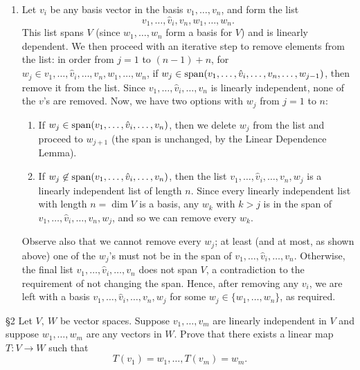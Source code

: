 \documentclass{homework}
\begin{document}
\begin{solution}
\begin{enumerate}[label=(\alph*)]
    \item Let $v_i$ be any basis vector in the basis $v_1,\ldots,v_n$, and form the list \[
      v_1,\ldots,\hat{v}_i, v_n, w_1,\ldots,w_n
    .\] This list spans $V$ (since $ w_1,\ldots,w_n$ form a basis for $V$) and is linearly
    dependent. We then proceed with an iterative step to remove elements from the list: in order
    from $j=1$ to $(n-1)+n$, for $w_j\in {v_1,\ldots,\hat{v}_i,\ldots,v_n, w_1,\ldots,w_n}$, if
    $w_j\in \operatorname{span}(v_1,\ldots,\hat{v}_i,\ldots,v_n,\ldots,w_{j-1})$, then remove it from the list.
    Since $ v_1,\ldots,\hat{v}_i,\ldots,v_n$ is linearly independent, none of the $v$'s are removed.
    Now, we have two options with $w_j$ from $j=1$ to $n$:
    \begin{enumerate}
      \item If $w_j\in \operatorname{span}(v_1,\ldots,\hat{v}_i,\ldots,v_n)$, then we delete $w_j$ from the list
        and proceed to $w_{j+1}$ (the span is unchanged, by the Linear Dependence Lemma).
      \item If $w_j\not\in \operatorname{span}(v_1,\ldots,\hat{v}_i,\ldots,v_n)$, then the list
        $v_1,\ldots,\hat{v}_i,\ldots,v_n, w_j$ is a linearly independent list of length $n$. Since
        every linearly independent list with length $n=\dim V$ is a basis, any $w_k$ with $k>j$ is
        in the span of $v_1,\ldots,\hat{v}_i,\ldots,v_n, w_j$, and so we can remove every $w_k$.
    \end{enumerate}
    Observe also that we cannot remove every $w_j$; at least (and at most, as shown above) one of
    the $w_j$'s must not be in the span of $v_1,\ldots,\hat{v}_i,\ldots,v_n$. Otherwise,
    the final list $v_1,\ldots,\hat{v}_i,\ldots,v_n$ does not span $V$, a contradiction to the
    requirement of not changing the span. Hence, after removing any $v_i$, we are left with a basis
    $v_1,\ldots,\hat{v}_i,\ldots,v_n,w_j$ for some $w_j\in \{ w_1,\ldots,w_n \}$, as required.
  \end{enumerate}
\end{solution}



\begin{problem}{\S 2}
  Let $V,\ W$ be vector spaces. Suppose $v_1,\ldots,v_m$ are linearly independent in $V$ and suppose
  $w_1,\ldots,w_m$ are any vectors in $W$. Prove that there exists a linear map $T:V\to W$ such that
  \[
    T(v_1)=w_1,\ldots,T(v_m)=w_m
  .\] 
\end{problem}
\end{document}
